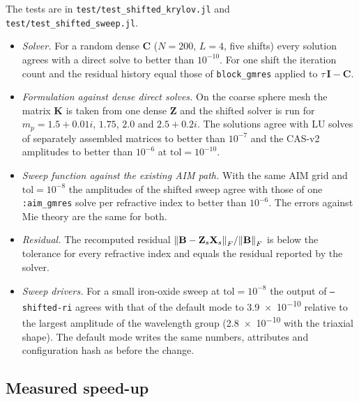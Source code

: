 \documentclass[11pt,a4paper]{article}
\begin{document}
The tests are in \texttt{test/test\_shifted\_krylov.jl} and
\texttt{test/test\_shifted\_sweep.jl}.
\begin{itemize}
  \item \emph{Solver.}
        For a random dense $\mathbf{C}$ ($N = 200$, $L = 4$, five
        shifts) every solution agrees with a direct solve to better
        than $10^{-10}$.
        For one shift the iteration count and the residual history
        equal those of \texttt{block\_gmres} applied to
        $\tau\,\mathbf{I} - \mathbf{C}$.
  \item \emph{Formulation against dense direct solves.}
        On the coarse sphere mesh the matrix $\mathbf{K}$ is taken from
        one dense $\mathbf{Z}$ and the shifted solver is run for
        $m_p = 1.5 + 0.01i$, $1.75$, $2.0$ and $2.5 + 0.2i$.
        The solutions agree with LU solves of separately assembled
        matrices to better than $10^{-7}$ and the CAS-v2 amplitudes to
        better than $10^{-6}$ at $\text{tol} = 10^{-10}$.
  \item \emph{Sweep function against the existing AIM path.}
        With the same AIM grid and $\text{tol} = 10^{-8}$ the amplitudes
        of the shifted sweep agree with those of one
        \texttt{:aim\_gmres} solve per refractive index to better than
        $10^{-6}$.
        The errors against Mie theory are the same for both.
  \item \emph{Residual.}
        The recomputed residual
        $\norm{\mathbf{B} - \mathbf{Z}_s\mathbf{X}_s}_F /
        \norm{\mathbf{B}}_F$ is below the tolerance for every
        refractive index and equals the residual reported by the solver.
  \item \emph{Sweep drivers.}
        For a small iron-oxide sweep at $\text{tol} = 10^{-8}$ the
        output of \texttt{--shifted-ri} agrees with that of the default
        mode to \num{3.9e-10} relative to the largest amplitude of the
        wavelength group (\num{2.8e-10} with the triaxial shape).
        The default mode writes the same numbers, attributes and
        configuration hash as before the change.
\end{itemize}

\subsection{Measured speed-up}
\label{sec:shift-benchmark}
\end{document}
